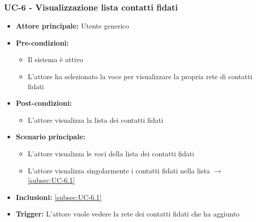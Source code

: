 \documentclass[a4paper,12pt]{article}
\begin{document}
\subsubsection{UC-6 - Visualizzazione lista contatti fidati} \label{sec:UC-6}
\begin{itemize}
    \item \textbf{Attore principale:} Utente generico
    \item \textbf{Pre-condizioni:}
    \begin{itemize}
        \item Il sistema è attivo
        \item L'attore ha selezionato la voce per visualizzare la propria rete di contatti fidati
    \end{itemize}
    \item \textbf{Post-condizioni:} 
    \begin{itemize}
        \item L'attore visualizza la lista dei contatti fidati
    \end{itemize}
    \item \textbf{Scenario principale:} 
    \begin{itemize}
        \item L'attore visualizza le voci della lista dei contatti fidati
        \item L'attore visualizza singolarmente i contatti fidati nella lista $\rightarrow$ \ref{subsec:UC-6.1} 
    \end{itemize}
    \item \textbf{Inclusioni:} \ref{subsec:UC-6.1}
    \item \textbf{Trigger:} L'attore vuole vedere la rete dei contatti fidati che ha aggiunto
\end{itemize}
\end{document}
